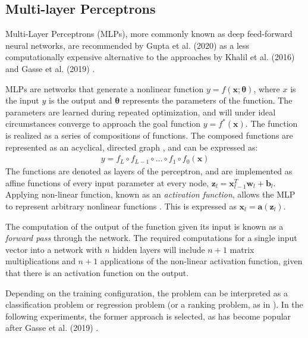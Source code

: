 \subsection{Multi-layer Perceptrons}\label{ssec:back_mlp}

Multi-Layer Perceptrons (\gls{MLP}s), more commonly known as deep feed-forward neural networks, are recommended by Gupta et al. (2020) \cite{gupta2020hybrid} as a less computationally expensive alternative to the approaches by Khalil et al. (2016) \cite{khalil2016learning} and Gasse et al. (2019) \cite{gasse2019exact}. 

\gls{MLP}s are networks that generate a nonlinear function $y = f(\mathbf{x}; \bm{\theta})$, where $x$ is the input $y$ is the output and $\bm{\theta}$ represents the parameters of the function. The parameters are learned during repeated optimization, and will under ideal circumstances converge to approach the goal function $y = f^*(\mathbf{x})$. The function is realized as a series of compositions of functions. The composed functions are represented as an acyclical, directed graph \cite{nielsen2018neural}, and can be expressed as:
\begin{align}
    y = f_L \circ f_{L-1} \circ \ldots \circ f_{1} \circ f_{0} (\mathbf{x})  
\end{align}
The functions are denoted as layers of the perceptron, and are implemented as affine functions of every input parameter at every node, $\mathbf{z}_l = \mathbf{x}_{l-1}^T \mathbf{w}_l + \mathbf{b}_l$. Applying non-linear function, known as an \textit{activation function}, allows the \gls{MLP} to represent arbitrary nonlinear functions \cite{goodfellow2016deep}. This is expressed as $\mathbf{x}_l = \mathbf{a}(\mathbf{z}_l)$.

The computation of the output of the function given its input is known as a \textit{forward pass} through the network. The required computations for a single input vector into a network with $ n $ hidden layers will include $ n + 1 $ matrix multiplications and $ n + 1 $ applications of the non-linear activation function, given that there is an activation function on the output. 

Depending on the training configuration, the problem can be interpreted as a classification problem or regression problem (or a ranking problem, as in \cite{khalil2016learning}). In the following experiments, the former approach is selected, as has become popular after Gasse et al. (2019) \cite{gasse2019exact}. 










